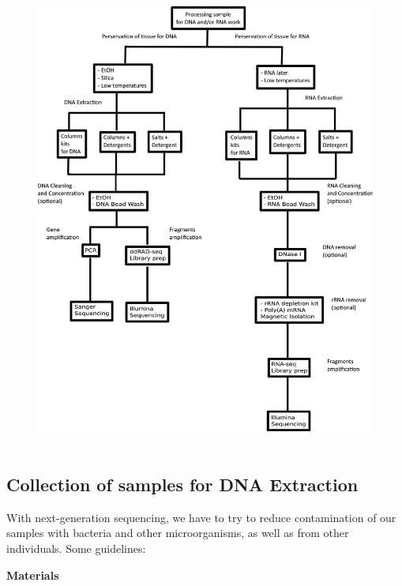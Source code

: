 \documentclass[11pt, oneside]{article}
\begin{document}
		\begin{figure}[h]
		\begin{center}
			\includegraphics[height=6in]{./images/RNA_DNA_Isolation_Chart.pdf}
		\end{center}
		\end{figure}

	\newpage

	\subsection{Collection of samples for DNA Extraction}

		With next-generation sequencing, we have to try to reduce contamination of our samples with bacteria and other microorganisms, as well as 			from other individuals. Some guidelines:

		\vspace{5mm}

	{\bf Materials}
		
\end{document}
